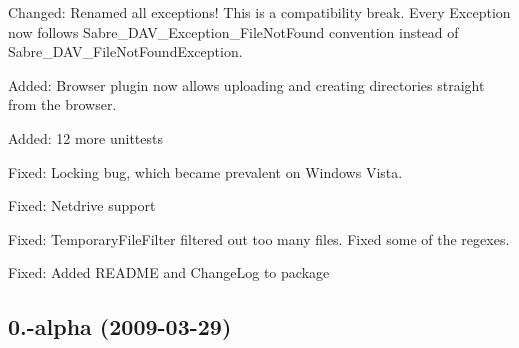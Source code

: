 \begin{DoxyItemize}
\item Changed\+: Renamed all exceptions! This is a compatibility break. Every Exception now follows Sabre\+\_\+\+D\+A\+V\+\_\+\+Exception\+\_\+\+File\+Not\+Found convention instead of Sabre\+\_\+\+D\+A\+V\+\_\+\+File\+Not\+Found\+Exception.
\item Added\+: Browser plugin now allows uploading and creating directories straight from the browser.
\item Added\+: 12 more unittests
\item Fixed\+: Locking bug, which became prevalent on Windows Vista.
\item Fixed\+: Netdrive support
\item Fixed\+: Temporary\+File\+Filter filtered out too many files. Fixed some of the regexes.
\item Fixed\+: Added R\+E\+A\+D\+ME and Change\+Log to package
\end{DoxyItemize}

\subsection*{0.-\/alpha (2009-\/03-\/29) }


